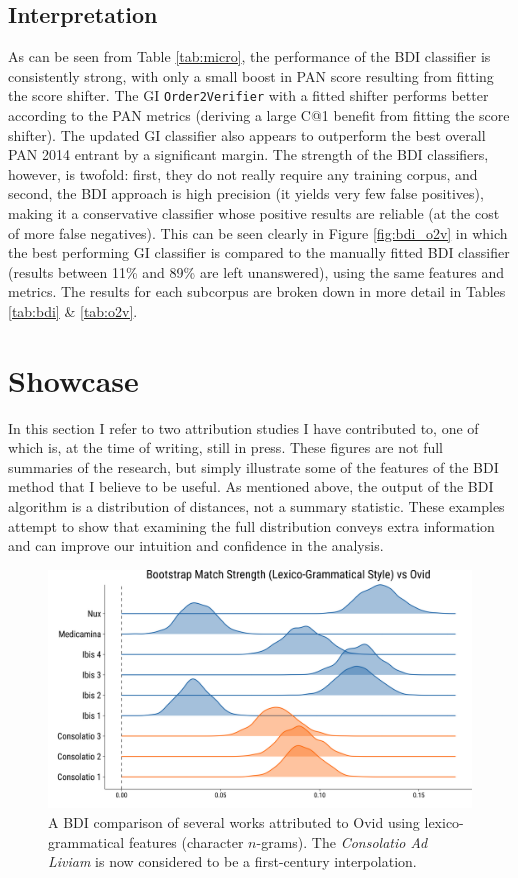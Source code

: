 \documentclass[
    hf
]{ceurart}
\begin{document}
\subsection{Interpretation}

As can be seen from Table \ref{tab:micro}, the performance of the BDI classifier is consistently
strong, with only a small boost in PAN score resulting from fitting the score shifter. The GI
\texttt{Order2Verifier} with a fitted shifter performs better according to the PAN metrics (deriving
a large C@1 benefit from fitting the score shifter). The updated GI classifier also appears to
outperform the best overall PAN 2014 entrant by a significant margin. The strength of the BDI
classifiers, however, is twofold: first, they do not really require any training corpus, and second,
the BDI approach is high precision (it yields very few false positives), making it a conservative
classifier whose positive results are reliable (at the cost of more false negatives). This can be
seen clearly in Figure \ref{fig:bdi_o2v} in which the best performing GI classifier is compared to
the manually fitted BDI classifier (results between 11\% and 89\% are left unanswered), using the
same features and metrics. The results for each subcorpus are broken down in more detail in Tables
\ref{tab:bdi} \& \ref{tab:o2v}.

\section{Showcase}\label{sec:showcase}

In this section I refer to two attribution studies I have contributed to, one of which is, at the
time of writing, still in press. These figures are not full summaries of the research, but simply
illustrate some of the features of the BDI method that I believe to be useful. As mentioned above,
the output of the BDI algorithm is a distribution of distances, not a summary statistic. These
examples attempt to show that examining the full distribution conveys extra information and can
improve our intuition and confidence in the analysis.

\begin{figure}
    \includegraphics[width=\linewidth]{figures/bootstrap_lexical_paper.png}
    \caption{A BDI comparison of several works attributed to Ovid using
        lexico-grammatical features (character $n$-grams). The \emph{Consolatio Ad
            Liviam} is now considered to be a first-century interpolation.}
    \label{fig:nux_lex}
\end{figure}
\end{document}
